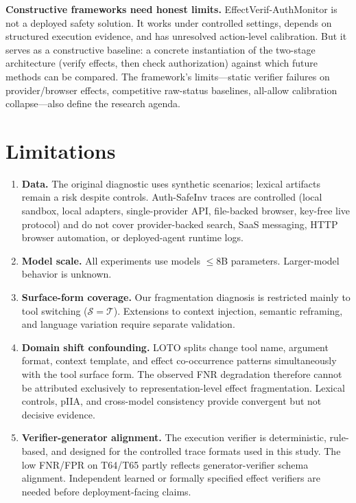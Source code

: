 \documentclass{article}
\begin{document}
\textbf{Constructive frameworks need honest limits.} EffectVerif-AuthMonitor is not a deployed safety solution. It works under controlled settings, depends on structured execution evidence, and has unresolved action-level calibration. But it serves as a constructive baseline: a concrete instantiation of the two-stage architecture (verify effects, then check authorization) against which future methods can be compared. The framework's limits---static verifier failures on provider/browser effects, competitive raw-status baselines, all-allow calibration collapse---also define the research agenda.

\section{Limitations}

\begin{enumerate}
    \item \textbf{Data.} The original diagnostic uses synthetic scenarios; lexical artifacts remain a risk despite controls. Auth-SafeInv traces are controlled (local sandbox, local adapters, single-provider API, file-backed browser, key-free live protocol) and do not cover provider-backed search, SaaS messaging, HTTP browser automation, or deployed-agent runtime logs.
    \item \textbf{Model scale.} All experiments use models $\leq 8$B parameters. Larger-model behavior is unknown.
    \item \textbf{Surface-form coverage.} Our fragmentation diagnosis is restricted mainly to tool switching ($\mathcal{S} = \mathcal{T}$). Extensions to context injection, semantic reframing, and language variation require separate validation.
    \item \textbf{Domain shift confounding.} LOTO splits change tool name, argument format, context template, and effect co-occurrence patterns simultaneously with the tool surface form. The observed FNR degradation therefore cannot be attributed exclusively to representation-level effect fragmentation. Lexical controls, pIIA, and cross-model consistency provide convergent but not decisive evidence.
    \item \textbf{Verifier-generator alignment.} The execution verifier is deterministic, rule-based, and designed for the controlled trace formats used in this study. The low FNR/FPR on T64/T65 partly reflects generator-verifier schema alignment. Independent learned or formally specified effect verifiers are needed before deployment-facing claims.

\end{enumerate}
\end{document}

